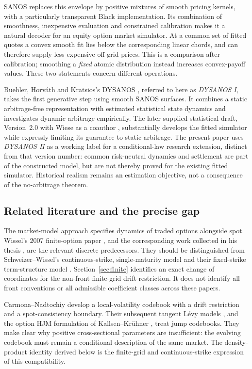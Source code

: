 \documentclass[11pt,a4paper]{article}
\numberwithin{equation}{section}
\theoremstyle{definition}\newtheorem{definition}[theorem]{Definition}
\theoremstyle{remark}\newtheorem{remark}[theorem]{Remark}
\begin{document}
SANOS \cite{SANOS} replaces this envelope by positive mixtures of smooth pricing kernels, with a particularly transparent Black implementation. Its combination of smoothness, inexpensive evaluation and constrained calibration makes it a natural decoder for an equity option market simulator. At a common set of fitted quotes a convex smooth fit lies below the corresponding linear chords, and can therefore supply less expensive off-grid prices. This is a comparison after calibration; smoothing a \emph{fixed} atomic distribution instead increases convex-payoff values. These two statements concern different operations.

Buehler, Horv\'ath and Kratsios's DYSANOS \cite{DYSANOS}, referred to here as \emph{DYSANOS I}, takes the first generative step using smooth SANOS surfaces. It combines a static arbitrage-free representation with estimated statistical state dynamics and investigates dynamic arbitrage empirically. The later supplied statistical draft, Version~2.0 with Wiese as a coauthor \cite{DYSANOSv2}, substantially develops the fitted simulator while expressly limiting its guarantee to static arbitrage. The present paper uses \emph{DYSANOS II} as a working label for a conditional-law research extension, distinct from that version number: common risk-neutral dynamics and settlement are part of the constructed model, but are not thereby proved for the existing fitted simulator. Historical realism remains an estimation objective, not a consequence of the no-arbitrage theorem.

\subsection{Related literature and the precise gap}
The market-model approach specifies dynamics of traded options alongside spot. Wissel's 2007 finite-option paper \cite{Wissel2007}, and the corresponding work collected in his thesis \cite{WisselThesis}, are the relevant discrete predecessors. They should be distinguished from Schweizer--Wissel's continuous-strike, single-maturity model \cite{SWMulti} and their fixed-strike term-structure model \cite{SWTerm}. Section~\ref{sec:finite} identifies an exact change of coordinates for the non-front finite-grid drift restriction. It does not identify all front conventions or all admissible coefficient classes across these papers.

Carmona--Nadtochiy \cite{CN2009,CN2008} develop a local-volatility codebook with a drift restriction and a spot-consistency boundary. Their subsequent tangent L\'evy models \cite{CN2012}, and the option HJM formulation of Kallsen--Kr\"uhner \cite{KK2015}, treat jump codebooks. They make clear why positive cross-sectional parameters are insufficient: the evolving codebook must remain a conditional description of the same market. The density-product identity derived below is the finite-grid and continuous-strike expression of this compatibility.
\end{document}

